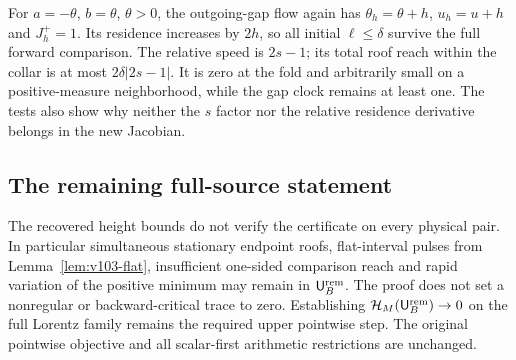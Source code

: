 For $a=-\theta$, $b=\theta$, $\theta>0$, the outgoing-gap flow
again has $\theta_h=\theta+h$, $u_h=u+h$ and $J_h^+=1$.
Its residence increases by $2h$, so all initial $\ell\le\delta$
survive the full forward comparison. The relative speed is $2s-1$;
its total roof reach within the collar is at most
$2\delta|2s-1|$. It is zero at the fold and arbitrarily small on
a positive-measure neighborhood, while the gap clock remains at
least one. The tests also show why neither the $s$ factor nor the
relative residence derivative belongs in the new Jacobian.

\subsection{The remaining full-source statement}
The recovered height bounds do not verify the certificate on every
physical pair. In particular simultaneous stationary endpoint roofs,
flat-interval pulses from Lemma~\ref{lem:v103-flat}, insufficient
one-sided comparison reach and rapid variation of the positive
minimum may remain in $\mathsf U_B^{\rm rem}$. The proof does not
set a nonregular or backward-critical trace to zero. Establishing
$\mathcal H_M(\mathsf U_B^{\rm rem})\to0$ on the full Lorentz
family remains the required upper pointwise step. The original
pointwise objective and all scalar-first arithmetic restrictions
are unchanged.
